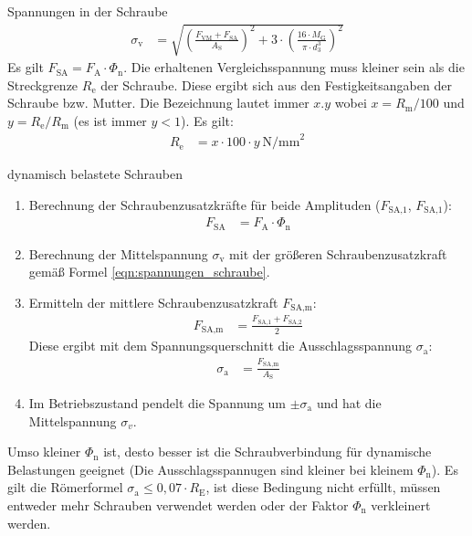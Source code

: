 \begin{eeqn}{Spannungen in der Schraube}
	\begin{align}
		\sigma_\text{v} &= \sqrt{\left(\frac{F_\text{VM}+F_\text{SA}}{A_\text{S}}\right)^2+3\cdot \left(\frac{16 \cdot M_\text{G}}{\pi \cdot d_3^3}\right)^2} \label{eqn:spannungen_schraube}
	\end{align}
	Es gilt $F_\text{SA} = F_\text{A}\cdot \Phi_\text{n}$. Die erhaltenen Vergleichsspannung muss kleiner sein als die Streckgrenze $R_\text{e}$ der Schraube. Diese ergibt sich aus den Festigkeitsangaben der Schraube bzw. Mutter. Die Bezeichnung lautet immer $x.y$ wobei $x=R_\text{m}/100$ und $y=R_\text{e}/R_\text{m}$ (es ist immer $y < 1$). Es gilt:
	\begin{align}
		R_\text{e} &= x \cdot 100 \cdot y ~\text{N/mm}^2
	\end{align}
\end{eeqn}

\begin{eeqn}{dynamisch belastete Schrauben}
	\begin{enumerate}[itemsep=0mm,leftmargin=12pt]
	\item Berechnung der Schraubenzusatzkräfte für beide Amplituden ($F_\text{SA,1}$, $F_\text{SA,1}$):
	\begin{align}
		F_\text{SA} &= F_\text{A}\cdot \Phi_\text{n}
	\end{align}
	\item Berechnung der Mittelspannung $\sigma_\text{v}$ mit der größeren Schraubenzusatzkraft gemäß Formel \ref{eqn:spannungen_schraube}.
	\item Ermitteln der mittlere Schraubenzusatzkraft $F_\text{SA,m}$:
	\begin{align}
		F_\text{SA,m} &= \frac{F_\text{SA,1} + F_\text{SA,2}}{2}
	\end{align}
	Diese ergibt mit dem Spannungsquerschnitt die Ausschlagsspannung $\sigma_\text{a}$:
	\begin{align}
		\sigma_\text{a} &= \frac{F_\text{SA,m}}{A_\text{S}}
	\end{align}
	\item Im Betriebszustand pendelt die Spannung um $\pm \sigma_\text{a}$ und hat die Mittelspannung $\sigma_{v}$.
	\end{enumerate}
	Umso kleiner $\Phi_\text{n}$ ist, desto besser ist die Schraubverbindung für dynamische Belastungen geeignet (Die Ausschlagsspannugen sind kleiner bei kleinem $\Phi_\text{n}$).
	Es gilt die Römerformel $\sigma_\text{a} \le 0,07 \cdot R_\text{E}$, ist diese Bedingung nicht erfüllt, müssen entweder mehr Schrauben verwendet werden oder der Faktor $\Phi_\text{n}$ verkleinert werden. \\
\end{eeqn}

